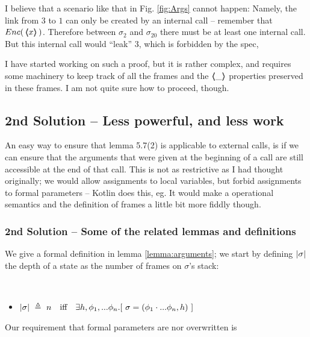 I believe that a scenario like that in Fig. \ref{fig:Args} cannot happen: Namely, the link from $3$ to $1$ can only be created by an internal call -- remember that ${{Enc(\, \langle\!\!\langle x \rangle\!\!\rangle\, )}}$. Therefore between $\sigma_2$ and $\sigma_{20}$ there must be at least one internal call. But this internal call would ``leak'' $3$, which is forbidden by the spec,

I have started working on such a proof, but it is rather complex, and requires some machinery to keep track of all the frames and the $\langle\!\!\langle \_ \rangle\!\!\rangle$ properties preserved in these frames. 
I am not quite sure how to proceed, though.

\subsection{2nd Solution -- Less powerful, and less work}


An easy way to ensure that   lemma 5.7(2) is applicable to external calls, is if we can ensure  that the arguments that were given at the beginning of a call are still accessible at the end of that call. This is not as restrictive as I had thought originally; we would allow assignments to local variables, but forbid assignments to formal parameters -- Kotlin does this, eg. It would make a operational semantics and the definition of frames a little bit more fiddly though.


\subsubsection{2nd Solution -- Some of the related lemmas and definitions}
We give a formal definition in lemma \ref{lemma:arguments}; we start by defining $|\sigma|$ the depth of a state as the number of frames on $\sigma$'s stack:

\begin{definition}$\strut \ \ \\$

\begin{itemize}
\item
$
\depth{\sigma} \ \triangleq\ n\ \ \  \mbox{iff}\ \ \ \exists h, \phi_1, ... \phi_n.[ \ \sigma = (\phi_1 \cdot ... \phi_n, h) \ ]
$
\end{itemize}
\end{definition}

Our requirement that formal parameters are nor overwritten is 

